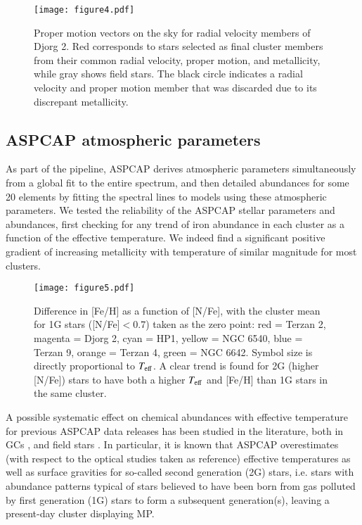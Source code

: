 \documentclass[onecolumn]{aa}
\begin{document}
\begin{figure}
   \sidecaption
   \texttt{[image: figure4.pdf]}
      \caption{Proper motion vectors on the sky for radial velocity members of Djorg 2. Red corresponds to stars selected as final cluster members from their common radial velocity, proper motion, and metallicity, while gray shows field stars. The black circle indicates a radial velocity and proper motion member that was discarded due to its discrepant metallicity.}
    \label{membership2}
\end{figure}

\subsection{ASPCAP atmospheric parameters}

As part of the pipeline, ASPCAP derives atmospheric parameters simultaneously from a global fit to the entire spectrum, and then detailed abundances for some 20 elements by fitting the spectral lines to models using these atmospheric parameters.
We tested the reliability of the ASPCAP stellar parameters and abundances, first checking for any trend of iron abundance in each cluster as a function of the effective temperature. 
We indeed find a significant positive gradient of increasing metallicity with temperature of similar magnitude for most clusters. 

\begin{figure*}
\centering
   \texttt{[image: figure5.pdf]}
      \caption{Difference in [Fe/H] as a function of [N/Fe], with the cluster mean for 1G stars ([N/Fe]$<$0.7) taken as the zero point: red = Terzan 2, magenta = Djorg 2, cyan = HP1, yellow = NGC 6540, blue = Terzan 9, orange = Terzan 4, green = NGC 6642.  Symbol size is directly proportional to $T_{\rm eff}$. A clear trend is found for 2G (higher [N/Fe]) stars to have both a higher $T_{\rm eff}$ and [Fe/H] than 1G stars in the same cluster.}
    \label{FevsN}
\end{figure*}

A possible systematic effect on chemical abundances with effective temperature for previous ASPCAP data releases has been studied in the literature, both in GCs \citep{Meszaros2013, Masseron2019}, and field stars \citep[e.g.,][]{Zasowski2019}. In particular,
it is known \citep{Henrik2018} that ASPCAP overestimates (with respect to the optical studies taken as reference) effective temperatures as well as surface gravities for so-called second generation (2G) stars, i.e. stars with abundance patterns typical of stars believed to have been born from gas polluted by  first generation (1G) stars to form a subsequent generation(s), leaving a present-day cluster displaying MP. 
\end{document}
